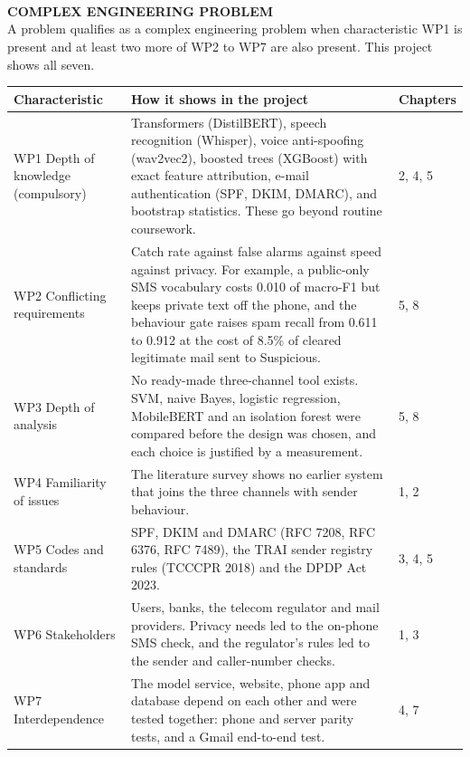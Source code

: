 \chapter*{}                  %
\\[0.3cm]
{\Large\bfseries COMPLEX ENGINEERING PROBLEM}\\[0.3cm]

A problem qualifies as a complex engineering problem when characteristic WP1 is present and at least two more of WP2 to WP7 are also present. This project shows all seven.

{\small{}
\begin{longtable}{|p{2.6cm}|p{9.2cm}|p{2.4cm}|}
\hline \textbf{Characteristic} & \textbf{How it shows in the project} & \textbf{Chapters} \\ \hline
\endhead
WP1 Depth of knowledge (compulsory) & Transformers (DistilBERT), speech recognition (Whisper), voice anti-spoofing (wav2vec2), boosted trees (XGBoost) with exact feature attribution, e-mail authentication (SPF, DKIM, DMARC), and bootstrap statistics. These go beyond routine coursework. & 2, 4, 5 \\ \hline
WP2 Conflicting requirements & Catch rate against false alarms against speed against privacy. For example, a public-only SMS vocabulary costs 0.010 of macro-F1 but keeps private text off the phone, and the behaviour gate raises spam recall from 0.611 to 0.912 at the cost of 8.5\% of cleared legitimate mail sent to Suspicious. & 5, 8 \\ \hline
WP3 Depth of analysis & No ready-made three-channel tool exists. SVM, naive Bayes, logistic regression, MobileBERT and an isolation forest were compared before the design was chosen, and each choice is justified by a measurement. & 5, 8 \\ \hline
WP4 Familiarity of issues & The literature survey shows no earlier system that joins the three channels with sender behaviour. & 1, 2 \\ \hline
WP5 Codes and standards & SPF, DKIM and DMARC (RFC 7208, RFC 6376, RFC 7489), the TRAI sender registry rules (TCCCPR 2018) and the DPDP Act 2023. & 3, 4, 5 \\ \hline
WP6 Stakeholders & Users, banks, the telecom regulator and mail providers. Privacy needs led to the on-phone SMS check, and the regulator's rules led to the sender and caller-number checks. & 1, 3 \\ \hline
WP7 Interdependence & The model service, website, phone app and database depend on each other and were tested together: phone and server parity tests, and a Gmail end-to-end test. & 4, 7 \\ \hline
\end{longtable}
}


